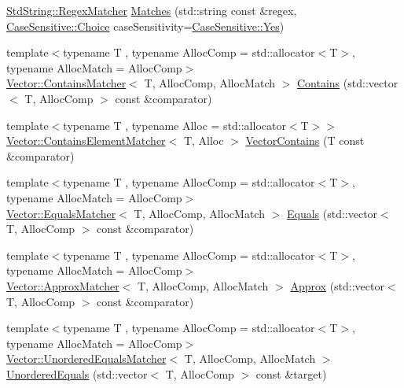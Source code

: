 \begin{DoxyCompactItemize}
\item 
\mbox{\hyperlink{struct_catch_1_1_matchers_1_1_std_string_1_1_regex_matcher}{Std\+String\+::\+Regex\+Matcher}} \mbox{\hyperlink{namespace_catch_1_1_matchers_a82f1893cf50ae4c14b9b3e0980bf22b8}{Matches}} (std\+::string const \&regex, \mbox{\hyperlink{struct_catch_1_1_case_sensitive_aad49d3aee2d97066642fffa919685c6a}{Case\+Sensitive\+::\+Choice}} case\+Sensitivity=\mbox{\hyperlink{struct_catch_1_1_case_sensitive_aad49d3aee2d97066642fffa919685c6aa7c5550b69ec3c502e6f609b67f9613c6}{Case\+Sensitive\+::\+Yes}})
\item 
{\footnotesize template$<$typename T , typename Alloc\+Comp  = std\+::allocator$<$\+T$>$, typename Alloc\+Match  = Alloc\+Comp$>$ }\\\mbox{\hyperlink{struct_catch_1_1_matchers_1_1_vector_1_1_contains_matcher}{Vector\+::\+Contains\+Matcher}}$<$ T, Alloc\+Comp, Alloc\+Match $>$ \mbox{\hyperlink{namespace_catch_1_1_matchers_a6016aefc79a29573e7bd540c40a0f4dc}{Contains}} (std\+::vector$<$ T, Alloc\+Comp $>$ const \&comparator)
\item 
{\footnotesize template$<$typename T , typename Alloc  = std\+::allocator$<$\+T$>$$>$ }\\\mbox{\hyperlink{struct_catch_1_1_matchers_1_1_vector_1_1_contains_element_matcher}{Vector\+::\+Contains\+Element\+Matcher}}$<$ T, Alloc $>$ \mbox{\hyperlink{namespace_catch_1_1_matchers_a95520b036d439e75aa9dcbe4ffa20188}{Vector\+Contains}} (T const \&comparator)
\item 
{\footnotesize template$<$typename T , typename Alloc\+Comp  = std\+::allocator$<$\+T$>$, typename Alloc\+Match  = Alloc\+Comp$>$ }\\\mbox{\hyperlink{struct_catch_1_1_matchers_1_1_vector_1_1_equals_matcher}{Vector\+::\+Equals\+Matcher}}$<$ T, Alloc\+Comp, Alloc\+Match $>$ \mbox{\hyperlink{namespace_catch_1_1_matchers_a3ab7fff821bc655bd4875cc1aa745101}{Equals}} (std\+::vector$<$ T, Alloc\+Comp $>$ const \&comparator)
\item 
{\footnotesize template$<$typename T , typename Alloc\+Comp  = std\+::allocator$<$\+T$>$, typename Alloc\+Match  = Alloc\+Comp$>$ }\\\mbox{\hyperlink{struct_catch_1_1_matchers_1_1_vector_1_1_approx_matcher}{Vector\+::\+Approx\+Matcher}}$<$ T, Alloc\+Comp, Alloc\+Match $>$ \mbox{\hyperlink{namespace_catch_1_1_matchers_ae706084b5987a683e0eecb79a18d7da9}{Approx}} (std\+::vector$<$ T, Alloc\+Comp $>$ const \&comparator)
\item 
{\footnotesize template$<$typename T , typename Alloc\+Comp  = std\+::allocator$<$\+T$>$, typename Alloc\+Match  = Alloc\+Comp$>$ }\\\mbox{\hyperlink{struct_catch_1_1_matchers_1_1_vector_1_1_unordered_equals_matcher}{Vector\+::\+Unordered\+Equals\+Matcher}}$<$ T, Alloc\+Comp, Alloc\+Match $>$ \mbox{\hyperlink{namespace_catch_1_1_matchers_aa1955107efa02ee9e0a9f2db9c160f1f}{Unordered\+Equals}} (std\+::vector$<$ T, Alloc\+Comp $>$ const \&target)
\end{DoxyCompactItemize}


